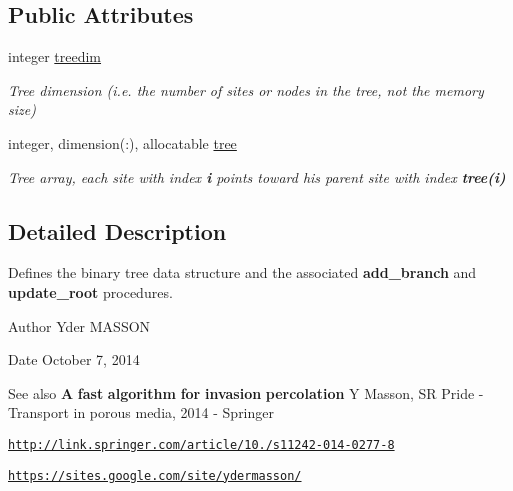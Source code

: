 \subsection*{\-Public \-Attributes}
\begin{DoxyCompactItemize}
\item 
integer \hyperlink{classmodule__binary__tree_a61c89527c6e2f4f499d86efd842c571a}{treedim}
\begin{DoxyCompactList}\small\item\em \-Tree dimension (i.\-e. the number of sites or nodes in the tree, not the memory size) \end{DoxyCompactList}\item 
integer, dimension(\-:), allocatable \hyperlink{classmodule__binary__tree_a85d3e520ba717952e9c915f085fa2caf}{tree}
\begin{DoxyCompactList}\small\item\em \-Tree array, each site with index {\bfseries i} points toward his parent site with index {\bfseries tree(i)} \end{DoxyCompactList}\end{DoxyCompactItemize}


\subsection{\-Detailed \-Description}
\-Defines the binary tree data structure and the associated {\bfseries add\-\_\-branch} and {\bfseries update\-\_\-root} procedures. 

\begin{DoxyAuthor}{\-Author}
\-Yder \-M\-A\-S\-S\-O\-N 
\end{DoxyAuthor}
\begin{DoxyDate}{\-Date}
\-October 7, 2014 
\end{DoxyDate}
\begin{DoxySeeAlso}{\-See also}
{\bfseries \-A} {\bfseries fast} {\bfseries algorithm} {\bfseries for} {\bfseries invasion} {\bfseries percolation} \-Y \-Masson, \-S\-R \-Pride -\/ \-Transport in porous media, 2014 -\/ \-Springer 

\href{http://link.springer.com/article/10.1007/s11242-014-0277-8}{\tt http\-://link.\-springer.\-com/article/10./s11242-\/014-\/0277-\/8} 

\href{https://sites.google.com/site/ydermasson/}{\tt https\-://sites.\-google.\-com/site/ydermasson/} 
\end{DoxySeeAlso}


